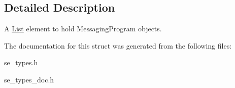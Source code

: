 \subsection{Detailed Description}
A \hyperlink{structList}{List} element to hold Messaging\+Program objects. 

The documentation for this struct was generated from the following files\+:\begin{DoxyCompactItemize}
\item 
se\+\_\+types.\+h\item 
se\+\_\+types\+\_\+doc.\+h\end{DoxyCompactItemize}
